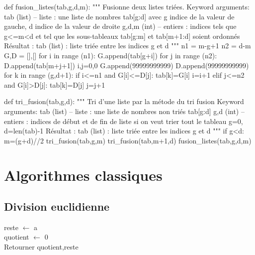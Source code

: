 \documentclass[10pt]{article}
\begin{document}
\begin{py}
\begin{python}
def fusion_listes(tab,g,d,m):
    """
    Fusionne deux listes triées.
    Keyword arguments:
    tab (list) -- liste : une liste de nombres tab[g:d] avec g indice de la 
    valeur de gauche, d indice de la valeur de droite
    g,d,m (int) -- entiers : indices tels que g<=m<d et tel que les 
    sous-tableaux tab[g:m] et tab[m+1:d] soient ordonnés
    Résultat :
    tab (list) : liste triée entre les indices g et d
    """
    n1 = m-g+1
    n2 = d-m
    G,D = [],[]
    for i in range (n1):
        G.append(tab[g+i])
    for j in range (n2):
        D.append(tab[m+j+1])
    i,j=0,0
    G.append(99999999999)
    D.append(99999999999)
    for k in range (g,d+1):
        if i<=n1 and  G[i]<=D[j]:
            tab[k]=G[i]
            i=i+1
        elif j<=n2 and G[i]>D[j]:
            tab[k]=D[j]
            j=j+1
            
def tri_fusion(tab,g,d):
    """
    Tri d'une liste par la métode du tri fusion
    Keyword arguments:
    tab (list) -- liste : une liste de nombres non triés tab[g:d]
    g,d (int) -- entiers : indices de début et de fin de liste si on veut trier
                           tout le tableau g=0, d=len(tab)-1
    Résultat :
    tab (list) : liste triée entre les indices g et d
    """
    if g<d:
        m=(g+d)//2
        tri_fusion(tab,g,m)
        tri_fusion(tab,m+1,d)
        fusion_listes(tab,g,d,m)
\end{python}
\end{py}

\section{Algorithmes classiques}
\subsection{Division euclidienne}
\begin{pseudo}
\begin{algorithm}[H]
reste $\gets$ a\\
quotient $\gets$ 0\\
Retourner quotient,reste
\end{algorithm}
\end{pseudo}
\end{document}
